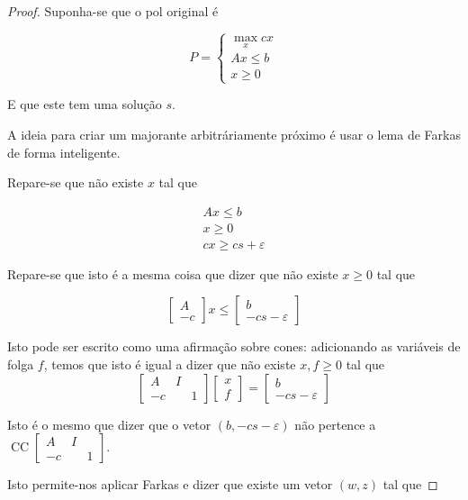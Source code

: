 \documentclass{article}
\DeclareMathOperator{\CC}{CC}
\theoremstyle{definition}
\begin{document}
	\begin{proof}
	Suponha-se que o pol original é
	
	\[
	P =
	\begin{cases}
	\max\limits_x cx\\
	Ax \leq b\\
	x \geq 0
	\end{cases}
	\]
	
	E que este tem uma solução $s$.
	
	A ideia para criar um majorante arbitráriamente próximo é usar o lema de Farkas de forma inteligente.
	
	Repare-se que não existe $x$ tal que
	
	\begin{gather*}
	Ax \leq b\\
	x \geq 0\\
	cx \geq cs + \varepsilon
	\end{gather*}
	
	Repare-se que isto é a mesma coisa que dizer que não existe $x \geq 0$ tal que
	
	\[
	\begin{bmatrix}A \\
	-c\end{bmatrix}
	x \leq
	\begin{bmatrix} b \\
	-cs - \varepsilon \end{bmatrix}
	\]
	
	Isto pode ser escrito como uma afirmação sobre cones: adicionando as variáveis de folga $f$, temos que isto é igual a dizer que não existe $x, f \geq 0$ tal que
	\[
	\begin{bmatrix}A & I & \\
	-c & & 1\end{bmatrix}
	\begin{bmatrix}x \\
	f\end{bmatrix}
	=
	\begin{bmatrix} b \\
	-cs - \varepsilon \end{bmatrix}
	\]
	
	Isto é o mesmo que dizer que o vetor $(b, -cs-\varepsilon)$ não pertence a $\CC \begin{bmatrix}A & I & \\
	-c & & 1\end{bmatrix}$.
	
	Isto permite-nos aplicar Farkas e dizer que existe um vetor $(w,z)$ tal que
	

\end{proof}
\end{document}

